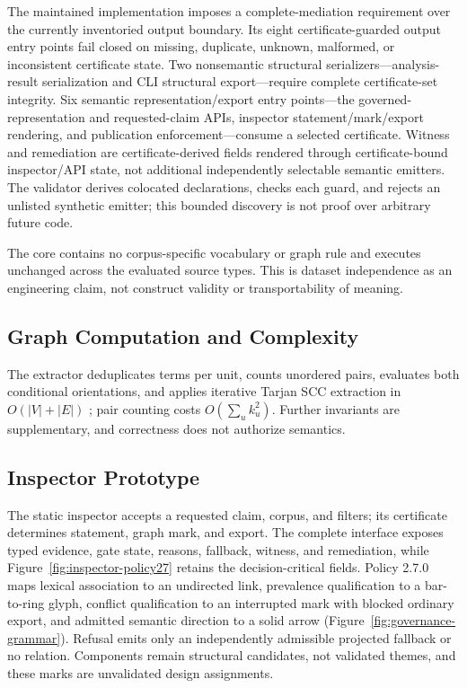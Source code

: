 \documentclass[manuscript,screen,review,anonymous]{acmart}
\begin{document}
The maintained implementation imposes a complete-mediation requirement over the currently inventoried output boundary. Its eight certificate-guarded output entry points fail closed on missing, duplicate, unknown, malformed, or inconsistent certificate state. Two nonsemantic structural serializers---analysis-result serialization and CLI structural export---require complete certificate-set integrity. Six semantic representation/export entry points---the governed-representation and requested-claim APIs, inspector statement/mark/export rendering, and publication enforcement---consume a selected certificate. Witness and remediation are certificate-derived fields rendered through certificate-bound inspector/API state, not additional independently selectable semantic emitters. The validator derives colocated declarations, checks each guard, and rejects an unlisted synthetic emitter; this bounded discovery is not proof over arbitrary future code.

The core contains no corpus-specific vocabulary or graph rule and executes unchanged across the evaluated source types. This is dataset independence as an engineering claim, not construct validity or transportability of meaning.

\subsection{Graph Computation and Complexity}

The extractor deduplicates terms per unit, counts unordered pairs, evaluates both conditional orientations, and applies iterative Tarjan SCC extraction in $O(|V|+|E|)$ \cite{tarjan1972}; pair counting costs $O(\sum_u k_u^2)$. Further invariants are supplementary, and correctness does not authorize semantics.

\subsection{Inspector Prototype}

The static inspector accepts a requested claim, corpus, and filters; its certificate determines statement, graph mark, and export. The complete interface exposes typed evidence, gate state, reasons, fallback, witness, and remediation, while Figure~\ref{fig:inspector-policy27} retains the decision-critical fields. Policy 2.7.0 maps lexical association to an undirected link, prevalence qualification to a bar-to-ring glyph, conflict qualification to an interrupted mark with blocked ordinary export, and admitted semantic direction to a solid arrow (Figure~\ref{fig:governance-grammar}). Refusal emits only an independently admissible projected fallback or no relation. Components remain structural candidates, not validated themes, and these marks are unvalidated design assignments.
\end{document}

